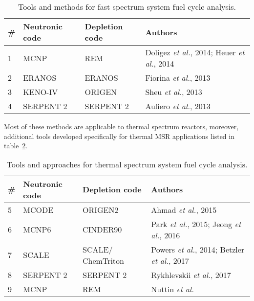 \begin{table}[h!]
\centering
\caption{Tools and methods for fast spectrum system fuel cycle analysis.}
\begin{tabular}{ |m{}|m{}|m{}|m{}|} 
\hline
\# & Neutronic code  & Depletion code    & Authors         \\[5pt]
\hline
1 & \gls{MCNP} \cite{noauthor_mcnp_2004}      & REM \cite{heuer_simulation_2010}  & Doligez \emph{et al.}, 2014; Heuer \emph{et al.}, 2014 \cite{doligez_coupled_2014,heuer_towards_2014}    \\[5pt]
\hline
2 & ERANOS \cite{ruggieri_eranos_2006}      & ERANOS     & Fiorina \emph{et al.}, 2013 \cite{fiorina_investigation_2013}\\[5pt]
\hline
3 & KENO-IV \cite{goluoglu_monte_2011}     & ORIGEN \cite{gauld_isotopic_2011}     & Sheu \emph{et al.}, 2013 \cite{sheu_depletion_2013} \\[5pt]
\hline
4 & SERPENT 2 \cite{leppanen_serpent_2015}   & SERPENT 2  & Aufiero \emph{et al.}, 2013 \cite{aufiero_extended_2013} \\[5pt]
\hline
\end{tabular}
  \label{tab:fs_codes}
\end{table}

Most of these methods are applicable to thermal spectrum reactors, moreover, additional tools developed specifically for thermal \gls{MSR} applications listed in table~\ref{tab:th_codes}.

\begin{table}[h!]
\centering
\caption{Tools and approaches for thermal spectrum system fuel cycle analysis.}
\begin{tabular}{ |m{}|m{}|m{}|m{}|} 
\hline
\# & Neutronic code  & Depletion code    & Authors         \\[5pt]
\hline
5 & MCODE \cite{xu_mcode_2008}      & ORIGEN2 \cite{croff_users_1980}      & Ahmad \emph{et al.}, 2015 \cite{ahmad_neutronics_2015}     \\[5pt]
\hline
6 & \gls{MCNP}6     & CINDER90 \cite{goorley_mcnp6_2013}     & Park \emph{et al.}, 2015; Jeong \emph{et al.}, 2016 \cite{park_whole_2015, jeong_equilibrium_2016}\\[5pt]
\hline
7 & SCALE \cite{bowman_scale_2011}      & SCALE/ ChemTriton \cite{powers_new_2013}    & Powers \emph{et al.}, 2014; Betzler \emph{et al.}, 2017 \cite{powers_new_2013,powers_inventory_2014,betzler_molten_2017}\\[5pt]
\hline
8 & SERPENT 2      & SERPENT 2     & Rykhlevskii \emph{et al.}, 2017 \cite{rykhlevskii_online_2017} \\[5pt]
\hline
9 & \gls{MCNP}      & REM  & Nuttin \emph{et al.} \cite{nuttin_potential_2005}    \\[5pt]
\hline
\end{tabular}
  \label{tab:th_codes}
\end{table}

